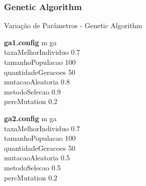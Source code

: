 \documentclass[compress, hide notes]{beamer}
\begin{document}
                
                
                \subsubsection{Genetic Algorithm}
				
				\begin{frame}[fragile]{Variação de Parâmetros - Genetic Algorithm}
					\begin{minipage}{5cm}
                    
						\begin{block}{\textbf{ga1.config}}
							m ga\\
                            taxaMelhorIndividuo 0.7\\
                            tamanhoPopulacao 100\\
                            quantidadeGeracoes 50\\
                            mutacaoAleatoria 0.8\\
                            metodoSelecao 0.9\\
                            percMutation 0.2
						\end{block}
					\end{minipage}\hfill
					\begin{minipage}{5cm}
                    
						\begin{block}{\textbf{ga2.config}}
                              m ga\\
                              taxaMelhorIndividuo 0.7\\
                              tamanhoPopulacao 100\\
                              quantidadeGeracoes 50\\
                              mutacaoAleatoria 0.5\\
                              metodoSelecao 0.5\\
                              percMutation 0.2
						\end{block}
					\end{minipage}
				\end{frame}
				
                
                
\end{document}

